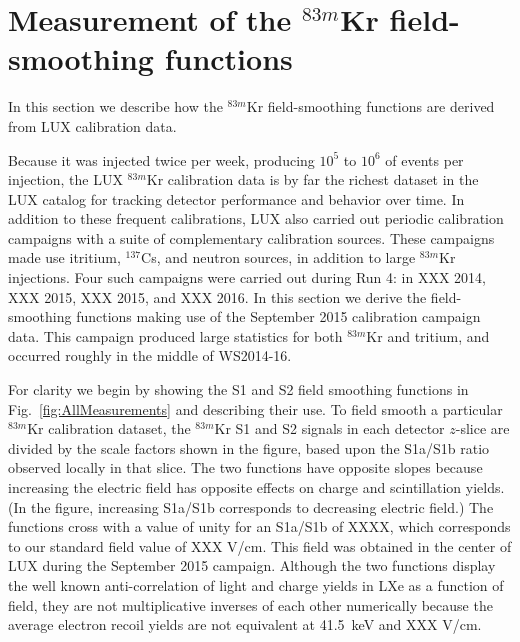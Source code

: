 



\section{Measurement of the $^{83m}$Kr field-smoothing functions}
\label{section:GenStrat}

In this section we describe how the $^{83m}$Kr field-smoothing functions are derived from LUX calibration data.

Because it was injected twice per week, producing $10^5$ to $10^6$ of events per injection, the LUX $^{83m}$Kr calibration data is 
by far the richest dataset in the LUX catalog for tracking detector performance and behavior over time. In addition to these frequent calibrations, 
LUX also carried out periodic calibration campaigns with a suite of complementary calibration sources. These campaigns made use itritium, 
$^{137}$Cs, and neutron sources, in addition to large $^{83m}$Kr injections. Four such campaigns were carried out during Run 4: in XXX 2014, 
XXX 2015, XXX 2015, and XXX 2016. In this section we derive the field-smoothing functions making use of the September 2015 
calibration campaign data. This campaign produced large statistics for both $^{83m}$Kr and tritium, and occurred roughly in the middle of WS2014-16.

For clarity we begin by showing the S1 and S2 field smoothing functions in Fig.~\ref{fig:AllMeasurements} and describing 
their use. To field smooth a particular $^{83m}$Kr calibration dataset, the $^{83m}$Kr S1 and S2 signals in each detector $z$-slice
are divided by the scale factors shown in the figure, based upon the S1a/S1b 
ratio observed locally in that slice. The two functions have opposite slopes because increasing the electric field has 
opposite effects on charge and scintillation yields. (In the figure, increasing S1a/S1b corresponds to decreasing electric field.)
The functions cross with a value of unity for an S1a/S1b of XXXX, which corresponds to our standard field value of XXX V/cm. 
This field was obtained in the center of LUX during the September 2015 campaign. Although the two functions display
the well known anti-correlation of light and charge yields in LXe as a function of field, they are not multiplicative inverses of each other
numerically because the average electron recoil yields are not equivalent at 41.5~keV and XXX V/cm. 

